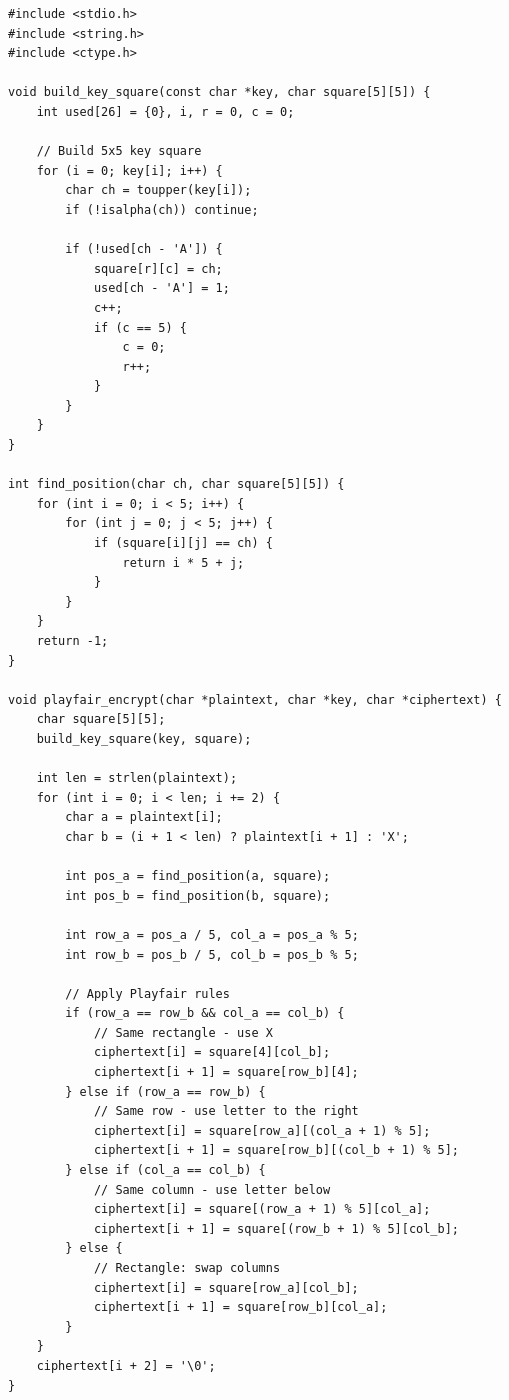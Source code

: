 \begin{lstlisting}[style=cstyle, caption={Playfair Cipher dalam C}]
#include <stdio.h>
#include <string.h>
#include <ctype.h>

void build_key_square(const char *key, char square[5][5]) {
    int used[26] = {0}, i, r = 0, c = 0;
    
    // Build 5x5 key square
    for (i = 0; key[i]; i++) {
        char ch = toupper(key[i]);
        if (!isalpha(ch)) continue;
        
        if (!used[ch - 'A']) {
            square[r][c] = ch;
            used[ch - 'A'] = 1;
            c++;
            if (c == 5) {
                c = 0;
                r++;
            }
        }
    }
}

int find_position(char ch, char square[5][5]) {
    for (int i = 0; i < 5; i++) {
        for (int j = 0; j < 5; j++) {
            if (square[i][j] == ch) {
                return i * 5 + j;
            }
        }
    }
    return -1;
}

void playfair_encrypt(char *plaintext, char *key, char *ciphertext) {
    char square[5][5];
    build_key_square(key, square);
    
    int len = strlen(plaintext);
    for (int i = 0; i < len; i += 2) {
        char a = plaintext[i];
        char b = (i + 1 < len) ? plaintext[i + 1] : 'X';
        
        int pos_a = find_position(a, square);
        int pos_b = find_position(b, square);
        
        int row_a = pos_a / 5, col_a = pos_a % 5;
        int row_b = pos_b / 5, col_b = pos_b % 5;
        
        // Apply Playfair rules
        if (row_a == row_b && col_a == col_b) {
            // Same rectangle - use X
            ciphertext[i] = square[4][col_b];
            ciphertext[i + 1] = square[row_b][4];
        } else if (row_a == row_b) {
            // Same row - use letter to the right
            ciphertext[i] = square[row_a][(col_a + 1) % 5];
            ciphertext[i + 1] = square[row_b][(col_b + 1) % 5];
        } else if (col_a == col_b) {
            // Same column - use letter below
            ciphertext[i] = square[(row_a + 1) % 5][col_a];
            ciphertext[i + 1] = square[(row_b + 1) % 5][col_b];
        } else {
            // Rectangle: swap columns
            ciphertext[i] = square[row_a][col_b];
            ciphertext[i + 1] = square[row_b][col_a];
        }
    }
    ciphertext[i + 2] = '\0';
}
\end{lstlisting}

